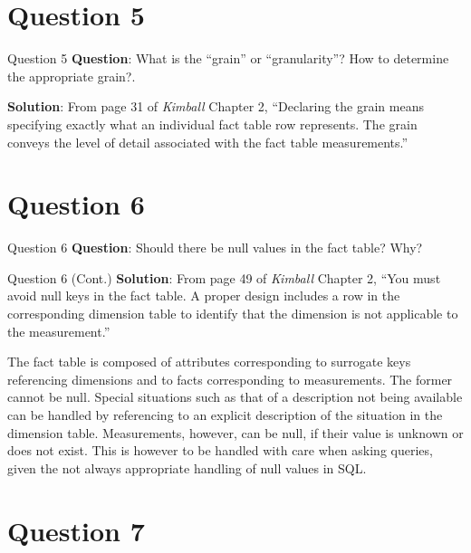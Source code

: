 \section*{Question 5}

\begin{frame}[fragile]{Question 5}
	\textbf{Question}: What is the ``grain'' or ``granularity''? How to determine the appropriate grain?.\\\vspace{10pt}
	
	\textbf{Solution}: From page 31 of \textit{Kimball} Chapter 2, ``Declaring the grain means specifying exactly what an individual fact table row represents.  The grain conveys the level of detail associated with the fact table measurements.''\\\vspace{5pt}
\end{frame}

\section*{Question 6}

\begin{frame}[fragile]{Question 6}
	\textbf{Question}: Should there be null values in the fact table? Why?	
\end{frame}

\begin{frame}[fragile]{Question 6 (Cont.)}
	\textbf{Solution}: From page 49 of \textit{Kimball} Chapter 2, ``You must avoid null keys in the fact table. A proper design includes a row in the corresponding dimension table to identify that the dimension is not applicable to the measurement.''\\\vspace{5pt}
	
	The fact table is composed of attributes corresponding to surrogate keys referencing dimensions and to facts corresponding to measurements. The former cannot be null. Special situations such as that of a description not being available can be handled by referencing to an explicit description of the situation in the dimension table. Measurements, however, can be null, if their value is unknown or does not exist. This is however to be handled with care when asking queries, given the not always appropriate handling of null values in SQL.
\end{frame}
\section*{Question 7}

